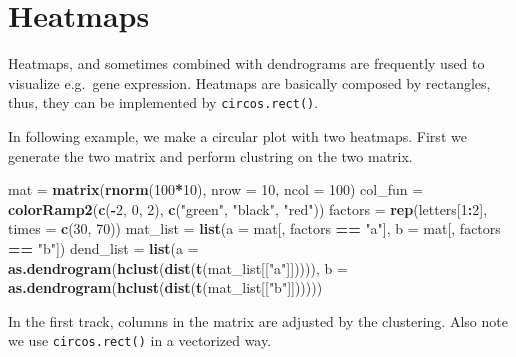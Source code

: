 \documentclass[]{book}
\newenvironment{Shaded}{\begin{snugshade}}{\end{snugshade}}
\newcommand{\KeywordTok}[1]{\textcolor[rgb]{0.13,0.29,0.53}{\textbf{#1}}}
\newcommand{\DataTypeTok}[1]{\textcolor[rgb]{0.13,0.29,0.53}{#1}}
\newcommand{\DecValTok}[1]{\textcolor[rgb]{0.00,0.00,0.81}{#1}}
\newcommand{\StringTok}[1]{\textcolor[rgb]{0.31,0.60,0.02}{#1}}
\newcommand{\OperatorTok}[1]{\textcolor[rgb]{0.81,0.36,0.00}{\textbf{#1}}}
\newcommand{\NormalTok}[1]{#1}
\theoremstyle{definition}
\theoremstyle{definition}
\theoremstyle{remark}
\begin{document}
\section{Heatmaps}\label{heatmaps}

Heatmaps, and sometimes combined with dendrograms are frequently used to
visualize e.g.~gene expression. Heatmaps are basically composed by
rectangles, thus, they can be implemented by \texttt{circos.rect()}.

In following example, we make a circular plot with two heatmaps. First
we generate the two matrix and perform clustring on the two matrix.

\begin{Shaded}
\begin{Highlighting}[]
\NormalTok{mat =}\StringTok{ }\KeywordTok{matrix}\NormalTok{(}\KeywordTok{rnorm}\NormalTok{(}\DecValTok{100}\OperatorTok{*}\DecValTok{10}\NormalTok{), }\DataTypeTok{nrow =} \DecValTok{10}\NormalTok{, }\DataTypeTok{ncol =} \DecValTok{100}\NormalTok{)}
\NormalTok{col_fun =}\StringTok{ }\KeywordTok{colorRamp2}\NormalTok{(}\KeywordTok{c}\NormalTok{(}\OperatorTok{-}\DecValTok{2}\NormalTok{, }\DecValTok{0}\NormalTok{, }\DecValTok{2}\NormalTok{), }\KeywordTok{c}\NormalTok{(}\StringTok{"green"}\NormalTok{, }\StringTok{"black"}\NormalTok{, }\StringTok{"red"}\NormalTok{))}
\NormalTok{factors =}\StringTok{ }\KeywordTok{rep}\NormalTok{(letters[}\DecValTok{1}\OperatorTok{:}\DecValTok{2}\NormalTok{], }\DataTypeTok{times =} \KeywordTok{c}\NormalTok{(}\DecValTok{30}\NormalTok{, }\DecValTok{70}\NormalTok{))}
\NormalTok{mat_list =}\StringTok{ }\KeywordTok{list}\NormalTok{(}\DataTypeTok{a =}\NormalTok{ mat[, factors }\OperatorTok{==}\StringTok{ "a"}\NormalTok{],}
                \DataTypeTok{b =}\NormalTok{ mat[, factors }\OperatorTok{==}\StringTok{ "b"}\NormalTok{])}
\NormalTok{dend_list =}\StringTok{ }\KeywordTok{list}\NormalTok{(}\DataTypeTok{a =} \KeywordTok{as.dendrogram}\NormalTok{(}\KeywordTok{hclust}\NormalTok{(}\KeywordTok{dist}\NormalTok{(}\KeywordTok{t}\NormalTok{(mat_list[[}\StringTok{"a"}\NormalTok{]])))),}
                 \DataTypeTok{b =} \KeywordTok{as.dendrogram}\NormalTok{(}\KeywordTok{hclust}\NormalTok{(}\KeywordTok{dist}\NormalTok{(}\KeywordTok{t}\NormalTok{(mat_list[[}\StringTok{"b"}\NormalTok{]])))))}
\end{Highlighting}
\end{Shaded}

In the first track, columns in the matrix are adjusted by the
clustering. Also note we use \texttt{circos.rect()} in a vectorized way.
\end{document}
